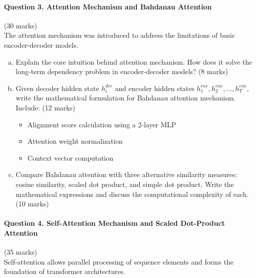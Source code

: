 \documentclass[12pt]{article}
\newcommand{\mediumanswer}{\vspace{3cm}}         %
\newcommand{\longanswer}{\vspace{4cm}}           %
\newcommand{\journalspace}{\vspace{4.5cm}}       %
\begin{document}
\newpage
\paragraph{Question 3. Attention Mechanism and Bahdanau Attention}\hfill (30 marks)\\
The attention mechanism was introduced to address the limitations of basic encoder-decoder models.

\begin{enumerate}[(a)]
    \item Explain the core intuition behind attention mechanism. How does it solve the long-term dependency problem in encoder-decoder models? \hfill (8 marks)
    
    \mediumanswer
    
    \item Given decoder hidden state $h_i^{dec}$ and encoder hidden states $h_1^{enc}, h_2^{enc}, \ldots, h_T^{enc}$, write the mathematical formulation for Bahdanau attention mechanism. Include: \hfill (12 marks)
    \begin{itemize}
        \item Alignment score calculation using a 2-layer MLP
        \item Attention weight normalization
        \item Context vector computation
    \end{itemize}
    
    \journalspace
    
    \item Compare Bahdanau attention with three alternative similarity measures: cosine similarity, scaled dot product, and simple dot product. Write the mathematical expressions and discuss the computational complexity of each. \hfill (10 marks)
    
    \longanswer
\end{enumerate}

\newpage
\paragraph{Question 4. Self-Attention Mechanism and Scaled Dot-Product Attention}\hfill (35 marks)\\
Self-attention allows parallel processing of sequence elements and forms the foundation of transformer architectures.
\end{document}
